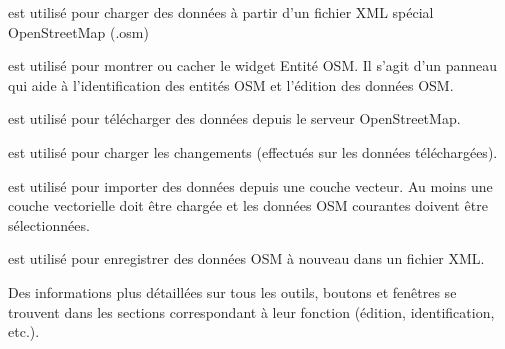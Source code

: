 \begin{description}
\item {} est utilisé pour charger des données à partir d'un fichier XML spécial OpenStreetMap (.osm)
\item {} est utilisé pour montrer ou cacher le widget Entité OSM. Il s'agit d'un panneau qui aide à l'identification des entités OSM et l'édition des données OSM.
\item {} est utilisé pour télécharger des données depuis le serveur OpenStreetMap.
\item {} est utilisé pour charger les changements (effectués sur les données téléchargées). 
\item {} est utilisé pour importer des données depuis une couche vecteur. Au moins une couche vectorielle doit être chargée et les données OSM courantes doivent être sélectionnées.
\item {} est utilisé pour enregistrer des données OSM à nouveau dans un fichier XML.
\end{description}

Des informations plus détaillées sur tous les outils, boutons et fenêtres se trouvent dans les sections correspondant à leur fonction (édition, identification, etc.).

